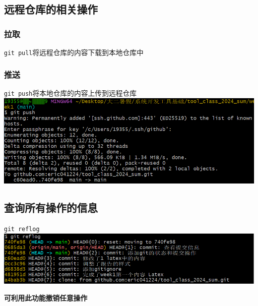 \documentclass[UTF8,a4paper]{ctexart}
\begin{document}
\subsection{远程仓库的相关操作}
\subsubsection{拉取}
\verb|git pull|\quad 将远程仓库的内容下载到本地仓库中
\subsubsection{推送}
\verb|git push|\quad 将本地仓库的内容上传到远程仓库\\
\includegraphics[width=1\textwidth]{push.png}

\subsection{查询所有操作的信息}
\verb|git reflog|\\
\includegraphics[width=1\textwidth]{reflog.png}\par
\textbf{可利用此功能撤销任意操作}
\end{document}
